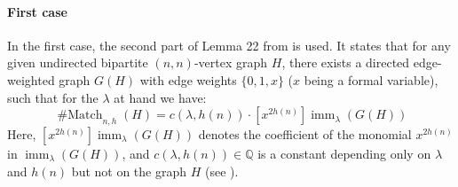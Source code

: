 \documentclass[10pt,a4paper]{article}
\theoremstyle{definition}
\theoremstyle{plain}
\theoremstyle{remark}
\newcommand{\bbQ}{\mathbb{Q}}
\DeclareMathOperator{\imm}{imm}
\DeclareMathOperator{\Match}{\# Match}
\begin{document}
\paragraph*{First case}
In the first case, the second part of Lemma 22 from \cite{curticapean2021full} is used. It states that for any given undirected bipartite $(n,n)$-vertex graph $H$, there exists a directed edge-weighted graph $G(H)$ with edge weights $\{0,1,x\}$ ($x$ being a formal variable), such that for the $\lambda$ at hand we have:
\begin{equation}
\Match_{n,h}(H) = c(\lambda, h(n)) \cdot [x^{2h(n)}] \imm_{\lambda}(G(H)) \label{eq:star2}
\end{equation}
Here, $[x^{2h(n)}] \imm_{\lambda}(G(H))$ denotes the coefficient of the monomial $x^{2h(n)}$ in $\imm_{\lambda}(G(H))$, and $c(\lambda, h(n)) \in \bbQ$ is a constant depending only on $\lambda$ and $h(n)$ but not on the graph $H$ (see \cite[Lemma 26]{curticapean2021complexitydichotomyimmanantfamilies}).
\end{document}
